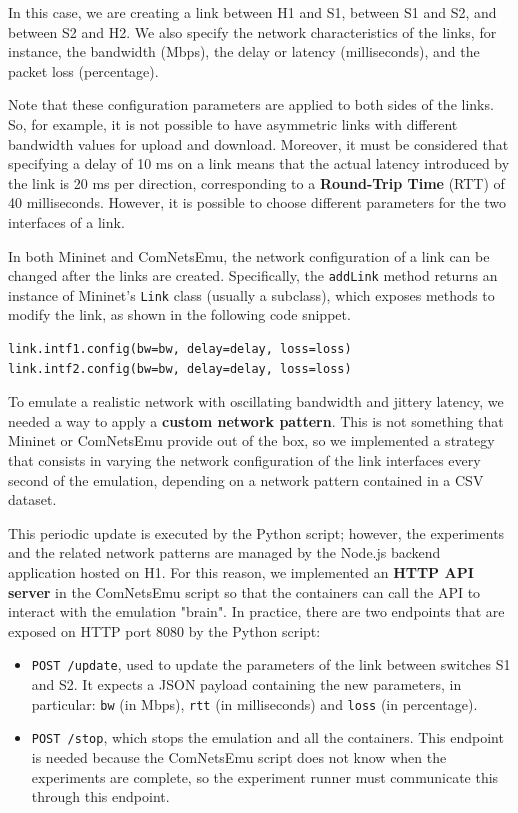 In this case, we are creating a link between H1 and S1, between S1 and S2, and between S2 and H2. We also specify the network characteristics of the links, for instance, the bandwidth (Mbps), the delay or latency (milliseconds), and the packet loss (percentage).

Note that these configuration parameters are applied to both sides of the links. So, for example, it is not possible to have asymmetric links with different bandwidth values for upload and download. Moreover, it must be considered that specifying a delay of 10 ms on a link means that the actual latency introduced by the link is 20 ms per direction, corresponding to a \textbf{Round-Trip Time} (RTT) of 40 milliseconds. However, it is possible to choose different parameters for the two interfaces of a link.

In both Mininet and ComNetsEmu, the network configuration of a link can be changed after the links are created. Specifically, the \texttt{addLink} method returns an instance of Mininet's \texttt{Link} class (usually a subclass), which exposes methods to modify the link, as shown in the following code snippet.

\begin{verbatim}
link.intf1.config(bw=bw, delay=delay, loss=loss)
link.intf2.config(bw=bw, delay=delay, loss=loss)
\end{verbatim}

To emulate a realistic network with oscillating bandwidth and jittery latency, we needed a way to apply a \textbf{custom network pattern}. This is not something that Mininet or ComNetsEmu provide out of the box, so we implemented a strategy that consists in varying the network configuration of the link interfaces every second of the emulation, depending on a network pattern contained in a CSV dataset.

This periodic update is executed by the Python script; however, the experiments and the related network patterns are managed by the Node.js backend application hosted on H1. For this reason, we implemented an \textbf{HTTP API server} in the ComNetsEmu script so that the containers can call the API to interact with the emulation "brain". In practice, there are two endpoints that are exposed on HTTP port 8080 by the Python script:


\begin{itemize}
    \item \texttt{POST /update}, used to update the parameters of the link between switches S1 and S2. It expects a JSON payload containing the new parameters, in particular: \texttt{bw} (in Mbps), \texttt{rtt} (in milliseconds) and \texttt{loss} (in percentage).
    \item \texttt{POST /stop}, which stops the emulation and all the containers. This endpoint is needed because the ComNetsEmu script does not know when the experiments are complete, so the experiment runner must communicate this through this endpoint.
\end{itemize}

